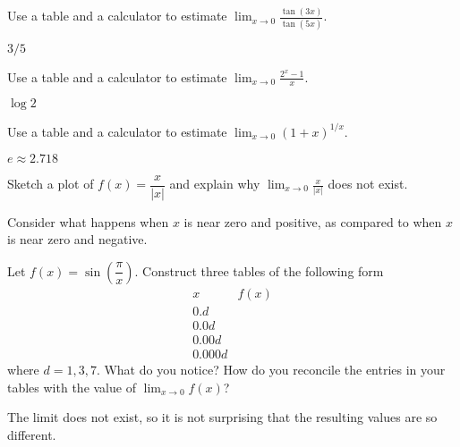 \begin{exercises}
\begin{exercise} 
Use a table and a calculator to estimate $\lim_{x\to
  0}\frac{\tan(3x)}{\tan(5x)}$.
\begin{answer}
$3/5$
\end{answer}

\end{exercise}

\begin{exercise} 
Use a table and a calculator to estimate $\lim_{x\to 0}
\frac{2^x-1}{x}$.
\begin{answer}
  $\log 2$
\end{answer}
\end{exercise}

\begin{exercise} 
Use a table and a calculator to estimate $\lim_{x\to 0} (1+x)^{1/x}$. 
\begin{answer}
  $e \approx 2.718$
\end{answer}
\end{exercise}



\begin{exercise} 
Sketch a plot of $f(x) = \dfrac{x}{|x|}$ and explain why $\lim_{x\to
  0} \frac{x}{|x|}$ does not exist.
\begin{answer}
  Consider what happens when $x$ is near zero and positive, as compared to when $x$ is near zero and negative.
\end{answer}
\end{exercise}



\begin{exercise} 
Let $f(x) = \sin\left(\dfrac{\pi}{x}\right)$. Construct three tables
of the following form
\[
\begin{array}{l|l}
 x & f(x) \\ \hline
 0.d &   \\
 0.0d &  \\
 0.00d &   \\
 0.000d &  
\end{array}
\]
where $d = 1,3,7$. What do you notice? How do you reconcile the
entries in your tables with the value of $\lim_{x\to 0} f(x)$?
\begin{answer}
  The limit does not exist, so it is not surprising that the resulting values are so different.
\end{answer}
\end{exercise}



\end{exercises}
